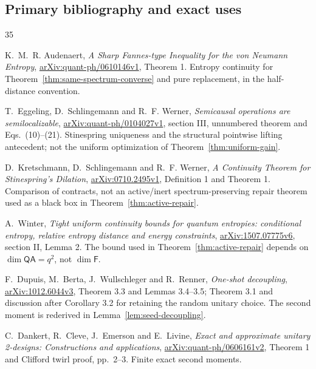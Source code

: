 \documentclass[11pt,a4paper]{article}
\numberwithin{equation}{section}
\theoremstyle{plain}
\theoremstyle{definition}
\newcommand{\rg}[1]{\mathsf{#1}}
\begin{document}
\subsection{Primary bibliography and exact uses}
\label{app:bibliography}
\begingroup
\renewcommand{\section}[2]{}
\begin{thebibliography}{35}

K.~M.~R. Audenaert, \emph{A Sharp Fannes-type Inequality for the von Neumann
Entropy}, \href{https://arxiv.org/pdf/quant-ph/0610146v1}{arXiv:quant-ph/0610146v1},
Theorem 1. Entropy continuity for Theorem~\ref{thm:same-spectrum-converse} and
pure replacement, in the half-distance convention.

T.~Eggeling, D.~Schlingemann and R.~F. Werner, \emph{Semicausal operations are
semilocalizable}, \href{https://arxiv.org/pdf/quant-ph/0104027v1}{arXiv:quant-ph/0104027v1},
section III, unnumbered theorem and Eqs.~(10)--(21). Stinespring uniqueness
and the structural pointwise lifting antecedent; not the uniform optimization
of Theorem~\ref{thm:uniform-gain}.

D.~Kretschmann, D.~Schlingemann and R.~F. Werner, \emph{A Continuity Theorem
for Stinespring's Dilation},
\href{https://arxiv.org/pdf/0710.2495v1}{arXiv:0710.2495v1}, Definition 1 and
Theorem 1. Comparison of contracts, not an active/inert spectrum-preserving
repair theorem used as a black box in Theorem~\ref{thm:active-repair}.

A.~Winter, \emph{Tight uniform continuity bounds for quantum entropies:
conditional entropy, relative entropy distance and energy constraints},
\href{https://arxiv.org/html/1507.07775v6}{arXiv:1507.07775v6}, section II,
Lemma 2. The bound used in Theorem~\ref{thm:active-repair} depends on
$\dim\rg{Q}\rg{A}=q^2$, not $\dim\rg{F}$.

F.~Dupuis, M.~Berta, J.~Wullschleger and R.~Renner, \emph{One-shot
decoupling}, \href{https://arxiv.org/html/1012.6044v3}{arXiv:1012.6044v3},
Theorem 3.3 and Lemmas 3.4--3.5; Theorem 3.1 and discussion after
Corollary 3.2 for retaining the random unitary choice. The second moment is
rederived in Lemma~\ref{lem:seed-decoupling}.

C.~Dankert, R.~Cleve, J.~Emerson and E.~Livine, \emph{Exact and approximate
unitary 2-designs: Constructions and applications},
\href{https://arxiv.org/pdf/quant-ph/0606161v2}{arXiv:quant-ph/0606161v2},
Theorem 1 and Clifford twirl proof, pp.~2--3. Finite exact second moments.


\end{thebibliography}
\end{document}
